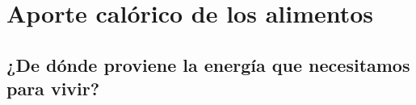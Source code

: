 \newpage \thispagestyle{plain}
\section{Aporte calórico de los alimentos}
\subsection{¿De dónde proviene la energía que necesitamos para vivir?}
